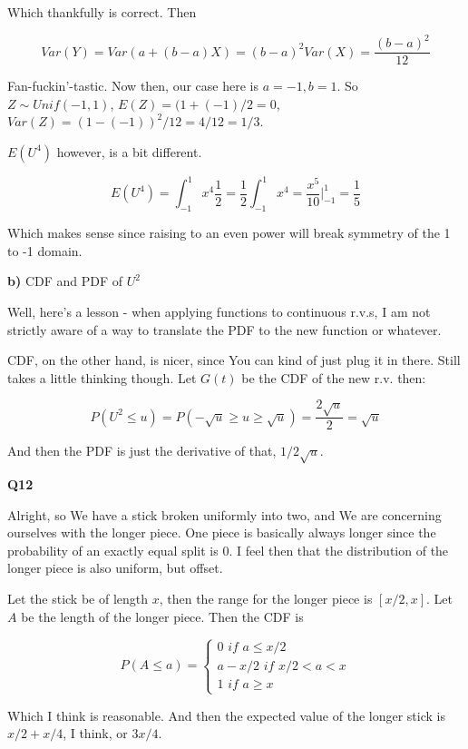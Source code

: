 \documentclass{article}
\begin{document}
			Which thankfully is correct. Then
			
			\[Var(Y) = Var(a + (b-a)X) = (b-a)^2Var(X) = \frac{(b-a)^2}{12} \]

			Fan-fuckin'-tastic. Now then, our case here is $a = -1, b = 1$. So $Z\sim Unif(-1, 1)$, $E(Z) = (1+(-1)/2 = 0$, $Var(Z) = (1-(-1))^2/12 = 4/12 = 1/3$.
			
			$E(U^4)$ however, is a bit different.
			
			\[ E(U^4) = \int^1_{-1} x^4 \frac{1}{2} = \frac{1}{2} \int^1_{-1} x^4 = \frac{x^5}{10}\bigg|^1_{-1} = \frac{1}{5} \]  

			Which makes sense since raising to an even power will break symmetry of the 1 to -1 domain.
				
			\textbf{b)} CDF and PDF of $U^2$
			
			Well, here's a lesson - when applying functions to continuous r.v.s, I am not strictly aware of a way to translate the PDF to the new function or whatever.
			
			CDF, on the other hand, is nicer, since You can kind of just plug it in there. Still takes a little thinking though. Let $G(t)$ be the CDF of the new r.v. then:
			
			\[ P(U^2 \le u) = P(-\sqrt{u} \ge u \ge \sqrt{u}) = \frac{2\sqrt{u}}{2} = \sqrt{u}  \]			
			
			And then the PDF is just the derivative of that, $1/2\sqrt{u}$.
			
			\hfill
			
		\textbf{Q12}
		
			Alright, so We have a stick broken uniformly into two, and We are concerning ourselves with the longer piece. One piece is basically always longer since the probability of an exactly equal split is 0. I feel then that the distribution of the longer piece is also uniform, but offset.
			
			Let the stick be of length $x$, then the range for the longer piece is $[x/2, x]$. Let $A$ be the length of the longer piece. Then the CDF is
			
			\[ P(A \le a) = \begin{cases} 0 \textit{ if } a\le x/2 \\
											a-x/2 \textit{ if } x/2 < a < x \\
											1 \textit{ if } a \ge x 
							\end{cases}\]
			
			Which I think is reasonable. And then the expected value of the longer stick is $x/2 + x/4$, I think, or $3x/4$.
			
\end{document}

